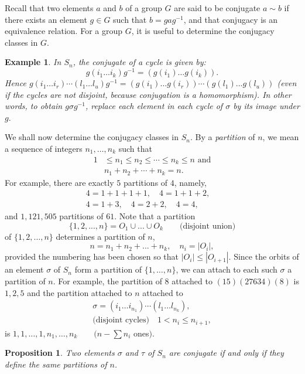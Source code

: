 \documentclass[a4paper,11pt,final,openany]{memoir}%
\newtheorem{proposition}[X]{Proposition}
\newtheorem{example}[X]{Example}
\theoremstyle{nonumberplain}
\begin{document}
Recall that two elements $a$ and $b$ of a group $G$ are said to be conjugate
$a\sim b$ if there exists an element $g\in G$ such that $b=gag^{-1}$, and that
conjugacy is an equivalence relation. For a group $G$, it is useful to
determine the conjugacy classes in $G$.

\begin{example}
\label{ga24} In $S_{n}$, the conjugate of a cycle is given by:
\[
g(i_{1}\ldots i_{k})g^{-1}=(g(i_{1})\ldots g(i_{k})).
\]
Hence $g(i_{1}\ldots i_{r})\cdots(l_{1}\ldots l_{u})g^{-1}=(g(i_{1})\ldots
g(i_{r}))\cdots(g(l_{1})...g(l_{u}))$ (even if the cycles are not disjoint,
because conjugation is a homomorphism). In other words, to obtain $g\sigma
g^{-1}$, replace each element in each cycle of $\sigma$ by its image under
$g.$
\end{example}

We shall now determine the conjugacy classes in $S_{n}$. By a
\emph{partition\/}%
of $n$, we mean a sequence of integers $n_{1},\ldots,n_{k}$ such that
\begin{align*}
1  &  \leq n_{1}\leq n_{2}\leq\cdots\leq n_{k}\leq n\text{ and}\\
&  n_{1}+n_{2}+\cdots+n_{k}=n.
\end{align*}
For example, there are exactly $5$ partitions of $4$, namely,%
\begin{align*}
4=1+1+1+1,\quad4=1+1+2,\quad\\
4=1+3,\quad4=2+2,\quad4=4,
\end{align*}
and $1,121,505$ partitions of $61$. Note that a partition
\[
\{1,2,...,n\}=O_{1}\cup...\cup O_{k}\qquad\text{(disjoint union)}%
\]
of $\{1,2,\ldots,n\}$ determines a partition of $n$,
\[
n=n_{1}+n_{2}+...+n_{k},\quad n_{i}=|O_{i}|,
\]
provided the numbering has been chosen so that $|O_{i}|\leq|O_{i+1}|$. Since
the orbits of an element $\sigma$ of $S_{n}$ form a partition of
$\{1,\ldots,n\}$, we can attach to each such $\sigma$ a partition of $n$. For
example, the partition of $8$ attached to $(15)(27634)(8)$ is $1,2,5$ and the
partition attached to $n$ attached to
\begin{align*}
\sigma=(i_{1}\ldots i_{n_{1}})\cdots(l_{1}\ldots l_{n_{k}}),\\
\text{(disjoint cycles)}\quad1<n_{i}\leq n_{i+1},
\end{align*}
is $1,1,\ldots,1,n_{1},\ldots,n_{k}\qquad(n-%
{\textstyle\sum}
n_{i}$ ones$).$

\begin{proposition}
\label{ga25} Two elements $\sigma$ and $\tau$ of $S_{n}$ are conjugate if and
only if they define the same partitions of $n$.
\end{proposition}
\end{document}
